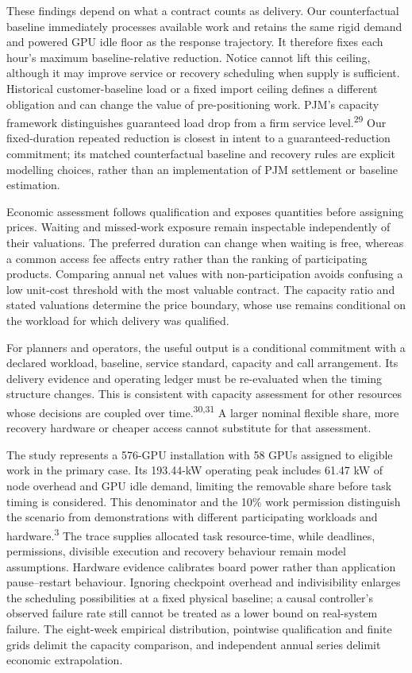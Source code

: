 \documentclass[10pt,a4paper]{article}
\begin{document}
These findings depend on what a contract counts as delivery. Our counterfactual baseline immediately processes available work and retains the same rigid demand and powered GPU idle floor as the response trajectory. It therefore fixes each hour's maximum baseline-relative reduction. Notice cannot lift this ceiling, although it may improve service or recovery scheduling when supply is sufficient. Historical customer-baseline load or a fixed import ceiling defines a different obligation and can change the value of pre-positioning work. PJM's capacity framework distinguishes guaranteed load drop from a firm service level.\textsuperscript{29} Our fixed-duration repeated reduction is closest in intent to a guaranteed-reduction commitment; its matched counterfactual baseline and recovery rules are explicit modelling choices, rather than an implementation of PJM settlement or baseline estimation.


Economic assessment follows qualification and exposes quantities before assigning prices. Waiting and missed-work exposure remain inspectable independently of their valuations. The preferred duration can change when waiting is free, whereas a common access fee affects entry rather than the ranking of participating products. Comparing annual net values with non-participation avoids confusing a low unit-cost threshold with the most valuable contract. The capacity ratio and stated valuations determine the price boundary, whose use remains conditional on the workload for which delivery was qualified.


For planners and operators, the useful output is a conditional commitment with a declared workload, baseline, service standard, capacity and call arrangement. Its delivery evidence and operating ledger must be re-evaluated when the timing structure changes. This is consistent with capacity assessment for other resources whose decisions are coupled over time.\textsuperscript{30,31} A larger nominal flexible share, more recovery hardware or cheaper access cannot substitute for that assessment.


The study represents a 576-GPU installation with 58 GPUs assigned to eligible work in the primary case. Its 193.44-kW operating peak includes 61.47 kW of node overhead and GPU idle demand, limiting the removable share before task timing is considered. This denominator and the 10\% work permission distinguish the scenario from demonstrations with different participating workloads and hardware.\textsuperscript{3} The trace supplies allocated task resource-time, while deadlines, permissions, divisible execution and recovery behaviour remain model assumptions. Hardware evidence calibrates board power rather than application pause–restart behaviour. Ignoring checkpoint overhead and indivisibility enlarges the scheduling possibilities at a fixed physical baseline; a causal controller's observed failure rate still cannot be treated as a lower bound on real-system failure. The eight-week empirical distribution, pointwise qualification and finite grids delimit the capacity comparison, and independent annual series delimit economic extrapolation.
\end{document}
